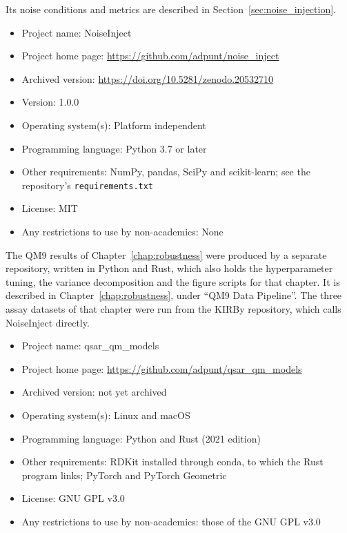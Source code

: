 Its noise conditions and metrics are described in Section~\ref{sec:noise_injection}.

\begin{itemize}
    \item Project name: NoiseInject
    \item Project home page: \url{https://github.com/adpunt/noise_inject}
    \item Archived version: \url{https://doi.org/10.5281/zenodo.20532710}
    \item Version: 1.0.0
    \item Operating system(s): Platform independent
    \item Programming language: Python 3.7 or later
    \item Other requirements: NumPy, pandas, SciPy and scikit-learn; see the repository's \texttt{requirements.txt}
    \item License: MIT
    \item Any restrictions to use by non-academics: None
\end{itemize}

The QM9 results of Chapter~\ref{chap:robustness} were produced by a separate repository, written in Python and Rust, which also holds the hyperparameter tuning, the variance decomposition and the figure scripts for that chapter. It is described in Chapter~\ref{chap:robustness}, under ``QM9 Data Pipeline''. The three assay datasets of that chapter were run from the KIRBy repository, which calls NoiseInject directly.

\begin{itemize}
    \item Project name: qsar\_qm\_models
    \item Project home page: \url{https://github.com/adpunt/qsar_qm_models}
    \item Archived version: not yet archived
    \item Operating system(s): Linux and macOS
    \item Programming language: Python and Rust (2021 edition)
    \item Other requirements: RDKit installed through conda, to which the Rust program links; PyTorch and PyTorch Geometric
    \item License: GNU GPL v3.0
    \item Any restrictions to use by non-academics: those of the GNU GPL v3.0
\end{itemize}

